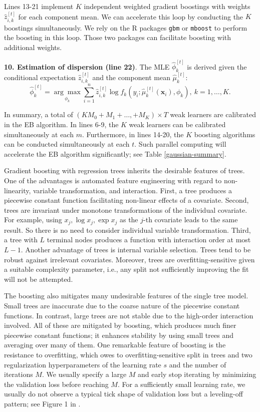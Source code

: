 \documentclass[11pt]{article}
\numberwithin{equation}{section}
\def\bx{\boldsymbol{x}}
\begin{document}
Lines 13-21 implement $K$ independent weighted gradient boostings with weights $\hat{z}_{i,k}^{[t]}$ for each component mean.
We can accelerate this loop  by conducting the $K$ boostings simultaneously.
We rely on the R packages {\tt gbm} or {\tt mboost} to perform the boosting in this loop. 
Those two packages can facilitate boosting with additional weights.


{\bf 10. Estimation of dispersion (line 22)}. 
The MLE $\hat{\phi}_k^{[t]}$ is derived given the conditional expectation $\hat{z}_{i,k}^{[t]}$ and the component mean $\hat{\mu}_k^{[t]}$:
\begin{equation}
		\hat{\phi}_k^{[t]}=\underset{\phi_k}{\arg\max} \sum_{i=1}^n\hat{z}_{i,k}^{[t]}\log f_k(y_i;\hat{\mu}_k^{[t]}(\bx_i),\phi_k), ~ k=1,\ldots,K.
\end{equation}

In summary, a total of $(KM_0+M_1+\ldots,+M_K)\times T$ weak learners are calibrated in the EB algorithm. 
In lines 6-9, the $K$ weak learners can be calibrated simultaneously at each $m$.
Furthermore, in lines 14-20, the $K$ boosting algorithms can be conducted simultaneously at each $t$. 
Such parallel computing will accelerate the EB algorithm significantly; see Table \ref{gaussian-summary}.

Gradient boosting with regression trees inherits the desirable features of trees.
One of the advantages is automated feature engineering with regard to non-linearity, variable transformation, and interaction. 
First, a tree produces a piecewise constant function facilitating non-linear effects of a covariate.
Second, trees are invariant under monotone transformations of the individual covariate. 
For example, using $x_j,\log x_j, \exp x_j$ as the $j$-th covariate leads to the same result.
So there is no need to consider individual variable transformation.
Third, a tree with $L$ terminal nodes produces a function with interaction order at most $L-1$.
Another advantage of trees is internal variable selection. Trees tend to be robust against irrelevant covariates.
Moreover, trees are overfitting-sensitive given a suitable complexity parameter, i.e., any split not sufficiently improving the fit will not be attempted. 

The boosting also mitigates many undesirable features of the single tree model. 
Small trees are inaccurate due to the coarse nature of the piecewise constant functions. In contrast, large trees are not stable due to the high-order interaction involved.
All of these are mitigated by boosting, which produces much finer piecewise constant functions; it enhances stability by using small trees and averaging over many of them.
One remarkable feature of boosting is the resistance to overfitting, which owes to overfitting-sensitive split in trees and two regularization hyperparameters of the learning rate $s$ and the number of iterations $M$.
We usually specify a large $M$ and early stop iterating by minimizing the validation loss before reaching $M$.
For a sufficiently small learning rate, we usually do not observe a typical tick shape of validation loss but a leveling-off pattern; see Figure 1 in \cite{friedman2001greedy}.
\end{document}
